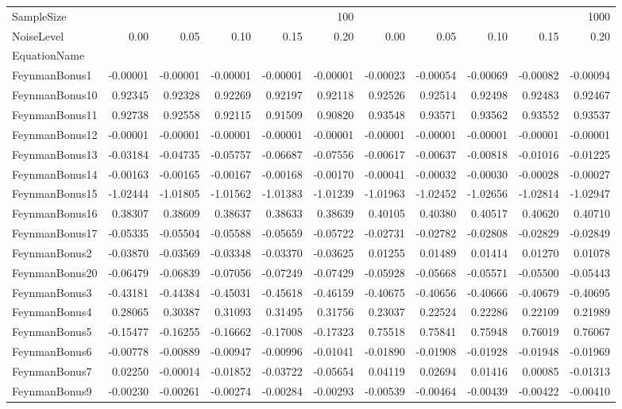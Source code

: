\begin{tabular}{lrrrrrrrrrr}
\toprule
SampleSize & \multicolumn{5}{r}{100} & \multicolumn{5}{r}{1000} \\
NoiseLevel & 0.00 & 0.05 & 0.10 & 0.15 & 0.20 & 0.00 & 0.05 & 0.10 & 0.15 & 0.20 \\
EquationName &  &  &  &  &  &  &  &  &  &  \\
\midrule
FeynmanBonus1 & -0.00001 & -0.00001 & -0.00001 & -0.00001 & -0.00001 & -0.00023 & -0.00054 & -0.00069 & -0.00082 & -0.00094 \\
FeynmanBonus10 & 0.92345 & 0.92328 & 0.92269 & 0.92197 & 0.92118 & 0.92526 & 0.92514 & 0.92498 & 0.92483 & 0.92467 \\
FeynmanBonus11 & 0.92738 & 0.92558 & 0.92115 & 0.91509 & 0.90820 & 0.93548 & 0.93571 & 0.93562 & 0.93552 & 0.93537 \\
FeynmanBonus12 & -0.00001 & -0.00001 & -0.00001 & -0.00001 & -0.00001 & -0.00001 & -0.00001 & -0.00001 & -0.00001 & -0.00001 \\
FeynmanBonus13 & -0.03184 & -0.04735 & -0.05757 & -0.06687 & -0.07556 & -0.00617 & -0.00637 & -0.00818 & -0.01016 & -0.01225 \\
FeynmanBonus14 & -0.00163 & -0.00165 & -0.00167 & -0.00168 & -0.00170 & -0.00041 & -0.00032 & -0.00030 & -0.00028 & -0.00027 \\
FeynmanBonus15 & -1.02444 & -1.01805 & -1.01562 & -1.01383 & -1.01239 & -1.01963 & -1.02452 & -1.02656 & -1.02814 & -1.02947 \\
FeynmanBonus16 & 0.38307 & 0.38609 & 0.38637 & 0.38633 & 0.38639 & 0.40105 & 0.40380 & 0.40517 & 0.40620 & 0.40710 \\
FeynmanBonus17 & -0.05335 & -0.05504 & -0.05588 & -0.05659 & -0.05722 & -0.02731 & -0.02782 & -0.02808 & -0.02829 & -0.02849 \\
FeynmanBonus2 & -0.03870 & -0.03569 & -0.03348 & -0.03370 & -0.03625 & 0.01255 & 0.01489 & 0.01414 & 0.01270 & 0.01078 \\
FeynmanBonus20 & -0.06479 & -0.06839 & -0.07056 & -0.07249 & -0.07429 & -0.05928 & -0.05668 & -0.05571 & -0.05500 & -0.05443 \\
FeynmanBonus3 & -0.43181 & -0.44384 & -0.45031 & -0.45618 & -0.46159 & -0.40675 & -0.40656 & -0.40666 & -0.40679 & -0.40695 \\
FeynmanBonus4 & 0.28065 & 0.30387 & 0.31093 & 0.31495 & 0.31756 & 0.23037 & 0.22524 & 0.22286 & 0.22109 & 0.21989 \\
FeynmanBonus5 & -0.15477 & -0.16255 & -0.16662 & -0.17008 & -0.17323 & 0.75518 & 0.75841 & 0.75948 & 0.76019 & 0.76067 \\
FeynmanBonus6 & -0.00778 & -0.00889 & -0.00947 & -0.00996 & -0.01041 & -0.01890 & -0.01908 & -0.01928 & -0.01948 & -0.01969 \\
FeynmanBonus7 & 0.02250 & -0.00014 & -0.01852 & -0.03722 & -0.05654 & 0.04119 & 0.02694 & 0.01416 & 0.00085 & -0.01313 \\
FeynmanBonus9 & -0.00230 & -0.00261 & -0.00274 & -0.00284 & -0.00293 & -0.00539 & -0.00464 & -0.00439 & -0.00422 & -0.00410 \\
\bottomrule
\end{tabular}
